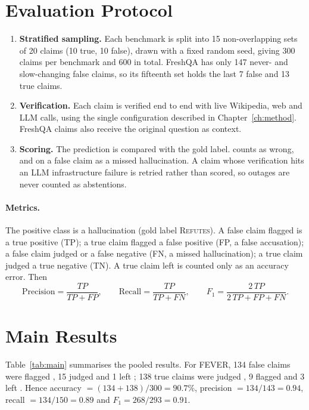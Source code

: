 \section{Evaluation Protocol}

\begin{enumerate}[itemsep=0.2em]
  \item \textbf{Stratified sampling.} Each benchmark is split into 15 non-overlapping sets of 20 claims (10 true, 10 false), drawn with a fixed random seed, giving 300 claims per benchmark and 600 in total. FreshQA has only 147 never- and slow-changing false claims, so its fifteenth set holds the last 7 false and 13 true claims.
  \item \textbf{Verification.} Each claim is verified end to end with live Wikipedia, web and LLM calls, using the single configuration described in Chapter~\ref{ch:method}. FreshQA claims also receive the original question as context.
  \item \textbf{Scoring.} The prediction is compared with the gold label. \Unk{} counts as wrong, and on a false claim as a missed hallucination. A claim whose verification hits an LLM infrastructure failure is retried rather than scored, so outages are never counted as abstentions.
\end{enumerate}

\paragraph{Metrics.} The positive class is a hallucination (gold label \textsc{Refutes}). A false claim flagged \Con{} is a true positive (TP); a true claim flagged \Con{} a false positive (FP, a false accusation); a false claim judged \Sup{} or \Unk{} a false negative (FN, a missed hallucination); a true claim judged \Sup{} a true negative (TN). A true claim left \Unk{} is counted only as an accuracy error. Then
\begin{equation}
  \text{Precision} = \frac{TP}{TP + FP}, \qquad \text{Recall} = \frac{TP}{TP + FN}, \qquad F_1 = \frac{2\,TP}{2\,TP + FP + FN}.
\end{equation}

\section{Main Results}

Table~\ref{tab:main} summarises the pooled results. For FEVER, 134 false claims were flagged \Con, 15 judged \Sup{} and 1 left \Unk; 138 true claims were judged \Sup, 9 flagged \Con{} and 3 left \Unk. Hence accuracy $= (134 + 138)/300 = 90.7\%$, precision $= 134/143 = 0.94$, recall $= 134/150 = 0.89$ and $F_1 = 268/293 = 0.91$.


